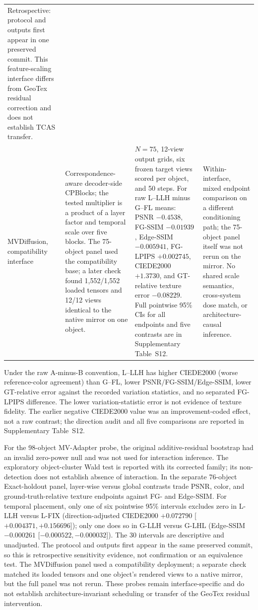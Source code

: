 \documentclass[times,twocolumn,final]{elsarticle}
\begin{document}
\begin{table}[t]
\begin{tabular}{p{2.4cm}p{4.0cm}p{4.2cm}p{4.5cm}}
Retrospective: protocol and outputs first appear in one preserved commit. This feature-scaling interface differs from GeoTex residual correction and does not establish TCAS transfer. \\
MVDiffusion, compatibility interface &
Correspondence-aware decoder-side CPBlocks; the tested multiplier is a product of a layer factor and temporal scale over five blocks. The 75-object panel used the compatibility base; a later check found 1,552/1,552 loaded tensors and 12/12 views identical to the native mirror on one object. &
$N=75$, 12-view output grids, six frozen target views scored per object, and 50 steps. For raw L--LLH minus G--FL means: PSNR $-0.4538$, FG-SSIM $-0.01939$, Edge-SSIM $-0.005941$, FG-LPIPS $+0.002745$, CIEDE2000 $+1.3730$, and GT-relative texture error $-0.08229$. Full pointwise 95\% CIs for all endpoints and five contrasts are in Supplementary Table~S12. &
Within-interface, mixed endpoint comparison on a different conditioning path; the 75-object panel itself was not rerun on the mirror. No shared scale semantics, cross-system dose match, or architecture-causal inference. \\
\bottomrule
\end{tabular}
\end{table}

Under the raw A-minus-B convention, L--LLH has higher CIEDE2000 (worse reference-color agreement) than G--FL, lower PSNR/FG-SSIM/Edge-SSIM, lower GT-relative error against the recorded variation statistics, and no separated FG-LPIPS difference. The lower variation-statistic error is not evidence of texture fidelity. The earlier negative CIEDE2000 value was an improvement-coded effect, not a raw contrast; the direction audit and all five comparisons are reported in Supplementary Table~S12.

For the 98-object MV-Adapter probe, the original additive-residual bootstrap had an invalid zero-power null and was not used for interaction inference. The exploratory object-cluster Wald test is reported with its corrected family; its non-detection does not establish absence of interaction. In the separate 76-object Exact-holdout panel, layer-wise versus global contrasts trade PSNR, color, and ground-truth-relative texture endpoints against FG- and Edge-SSIM. For temporal placement, only one of six pointwise 95\% intervals excludes zero in L-LLH versus L-FIX (direction-adjusted CIEDE2000 $+0.072790$ [$+0.004371,+0.156696$]); only one does so in G-LLH versus G-LHL (Edge-SSIM $-0.000261$ [$-0.000522,-0.000032$]). The 30 intervals are descriptive and unadjusted. The protocol and outputs first appear in the same preserved commit, so this is retrospective sensitivity evidence, not confirmation or an equivalence test. The MVDiffusion panel used a compatibility deployment; a separate check matched its loaded tensors and one object's rendered views to a native mirror, but the full panel was not rerun. These probes remain interface-specific and do not establish architecture-invariant scheduling or transfer of the GeoTex residual intervention.
\end{document}
